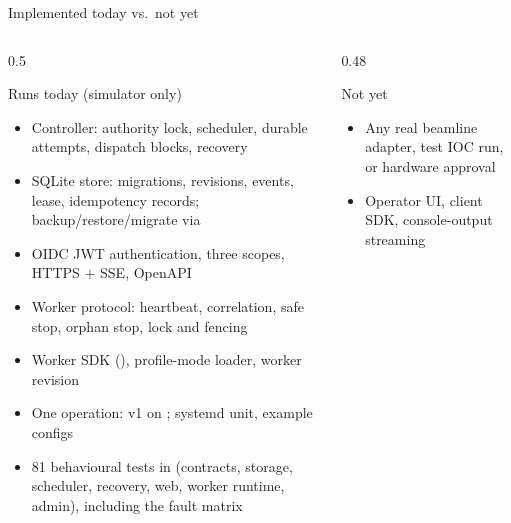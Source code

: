 

\begin{frame}{Implemented today vs.\ not yet}
    \begin{columns}[T]
        \begin{column}{0.5\textwidth}
            \begin{exampleblock}{Runs today (simulator only)}
                \footnotesize
                \begin{itemize}
                    \item Controller: authority lock, scheduler, durable attempts, dispatch blocks, recovery
                    \item SQLite store: migrations, revisions, events, lease, idempotency records;
                          backup/restore/migrate via 
                    \item OIDC JWT authentication, three scopes, HTTPS + SSE, OpenAPI
                    \item Worker protocol: heartbeat, correlation, safe stop, orphan stop, lock and fencing
                    \item Worker SDK (), profile-mode loader, worker revision
                    \item One operation:  v1 on ; systemd unit, example configs
                    \item 81 behavioural tests in  (contracts, storage, scheduler, recovery,
                          web, worker runtime, admin), including the fault matrix
                \end{itemize}
            \end{exampleblock}
        \end{column}
        \begin{column}{0.48\textwidth}
            \begin{alertblock}{Not yet}
                \footnotesize
                \begin{itemize}
                    \item Any real beamline adapter, test IOC run, or hardware approval
                    \item Operator UI, client SDK, console-output streaming

\end{itemize}
\end{alertblock}
\end{column}
\end{columns}
\end{frame}
